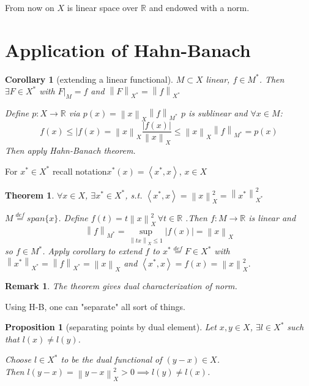 \documentclass{article}
\newcommand{\nextline}{\hfill\break}
\newcommand{\inne}[2]{\left<{#1},{#2}\right>}
\newcommand{\norm}[1]{\left\|{#1}\right\|}
\newcommand{\dual}[1]{{#1}^*}
\newcommand{\func}[3]{\({#1}:{#2}\xrightarrow{}{#3}\)}
\newcommand{\real}{\mathbb{R}}
\newtheorem{proposition}[example]{Proposition}
\newtheorem{remark}[example]{Remark}
\newtheorem{theorem}[example]{Theorem}
\newtheorem{corollary}[example]{Corollary}
\begin{document}
From now on \(X\) is linear space over \(\real\) and endowed with a norm.
\newpage
\section{Application of Hahn-Banach} 
\begin{corollary}[extending a linear functional]\rm\nextline
    \(M\subset X\) linear, \(f\in \dual M\). Then \(\exists F\in \dual X\) with \(F|_M=f\) and \(\norm{F}_{\dual{X}}=\norm{f}_{\dual{X}}\)
    \begin{pf}{}{}
    Define \func{p}{X}{\real} via \(p(x)=\norm{x}_X\norm{f}_{\dual M}\)
    \(p\) is sublinear and \(\forall x\in M\):
    $$
f(x)\leq|f(x)=\norm{x}_X\frac{|f(x)|}{\norm{x}_X}\leq\norm{x}_X\norm{f}_{\dual M}=p(x)
    $$
    Then apply Hahn-Banach theorem. 
    \end{pf}
\end{corollary}
{{For \(\dual x\in \dual X\) recall notation\( \dual x(x)=\inne{\dual x}{x}\), \(x\in X\)}}
\begin{theorem}\rm\nextline
    \(\forall x \in  X\), \(\exists \dual x \in \dual X\), s.t. \(\inne{\dual x}{x}=\norm{x}_X^2=\norm{\dual x}_{\dual X}^2\)
    \begin{pf}{}{}
    \(M\stackrel{def}{=}{span\{x\}}\). Define
  \(f(t)=t\norm{x}^2_X\,\forall t\in \real\)
    .Then \func{f}{M}{\real} is linear and 
    $$
    \norm{f}_{\dual M}=\sup_{\norm{tx}_X\leq 1}|f(x)|=\norm{x}_X
    $$
    so \(f\in \dual M\). Apply corollary to extend \(f\) to \(\dual x\stackrel{def}{=}F\in \dual X\) with \(\norm{\dual x}_{\dual X}=\norm{f}_{\dual X}=\norm{x}_X\) and \(\inne {\dual x}{x}=f(x)=\norm{x}^2_X. \)\end{pf}
\end{theorem}
\begin{remark}\rm\nextline
    The theorem gives dual characterization of norm.
\end{remark}
Using H-B, one can "separate" all sort of things.
\begin{proposition}[separating points by dual element]\rm\nextline
	Let  \(x,y\in X\), \(\exists l\in\dual{X}\) such that \(l(x)\neq l(y)\).
	\begin{pf}{}{}
		Choose \(l\in \dual{X}\) to be the dual functional of \((y-x)\in X\). \\Then \(l(y-x)=\norm{y-x}^2_X>0\implies l(y)\neq l(x)\).
	\end{pf}
\end{proposition}
\end{document}
